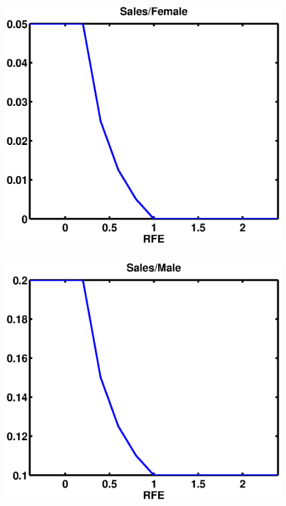 \documentclass[mathserif]{beamer}
\begin{document}
\begin{frame}
\begin{center}
\frametitle{\insertsubsection}
\includegraphics[width=0.9\textwidth]{salefem}
\end{center}
\end{frame}

\begin{frame}
\begin{center}
\frametitle{\insertsubsection}
\includegraphics[width=0.9\textwidth]{salemale}
\end{center}
\end{frame}
\end{document}
